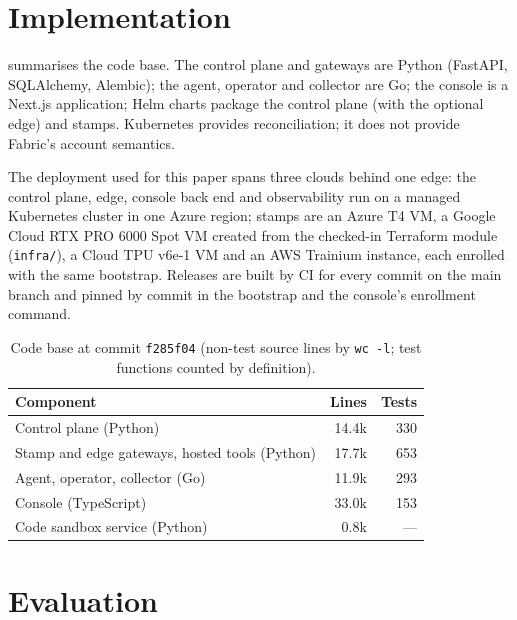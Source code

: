 \documentclass[conference,letterpaper]{IEEEtran}
\newcommand{\sys}{Fabric}
\newcommand{\code}[1]{\texttt{\small #1}}
\newcommand{\commit}{\code{f285f04}}
\begin{document}
\section{Implementation}
\label{sec:impl}
 summarises the code base. The control plane and gateways are Python (FastAPI,
SQLAlchemy, Alembic); the agent, operator and collector are Go; the console is a Next.js
application; Helm charts package the control plane (with the optional edge) and stamps.
Kubernetes provides reconciliation; it does not provide \sys{}'s account semantics.

The deployment used for this paper spans three clouds behind one edge: the control plane, edge,
console back end and observability run on a managed Kubernetes cluster in one Azure region; stamps
are an Azure T4 VM, a Google Cloud RTX PRO 6000 Spot VM created from the checked-in Terraform
module (\code{infra/}), a Cloud TPU v6e-1 VM and an AWS Trainium instance, each enrolled with the
same bootstrap. Releases are built by CI for every commit on the main branch and pinned by commit
in the bootstrap and the console's enrollment command.

\begin{table}[t]
\centering
\caption{Code base at commit \commit{} (non-test source lines by \code{wc -l}; test
functions counted by definition).}
\label{tab:impl}
\footnotesize
\begin{tabularx}{\columnwidth}{@{}X r r@{}}
\toprule
Component & Lines & Tests \\
\midrule
Control plane (Python) & 14.4k & 330 \\
Stamp and edge gateways, hosted tools (Python) & 17.7k & 653 \\
Agent, operator, collector (Go) & 11.9k & 293 \\
Console (TypeScript) & 33.0k & 153 \\
Code sandbox service (Python) & 0.8k & --- \\
\bottomrule
\end{tabularx}
\end{table}

\section{Evaluation}
\label{sec:eval}
\end{document}

